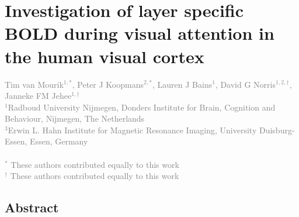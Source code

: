 
\chapter{Investigation of layer specific BOLD during visual attention in the human visual cortex}
\label{ch:attention}
\thispagestyle{empty}

\textcolor{gray}{{Tim van Mourik$^{1,*}$}, Peter J Koopmans$^{2,*}$, Lauren J Bains$^{1}$, David G Norris$^{1,2,\dagger}$, Janneke FM Jehee$^{1,\dagger}$\\
$^{1}$Radboud University Nijmegen, Donders Institute for Brain, Cognition and Behaviour, Nijmegen, The Netherlands \\
$^{3}$Erwin L. Hahn Institute for Magnetic Resonance Imaging, University Duisburg-Essen, Essen, Germany\\
\\
$^*$ 		{These authors contributed equally to this work} 
\\
$^\dagger$  {These authors contributed equally to this work}
}

\newpage
\section*{Abstract}

\newpage








